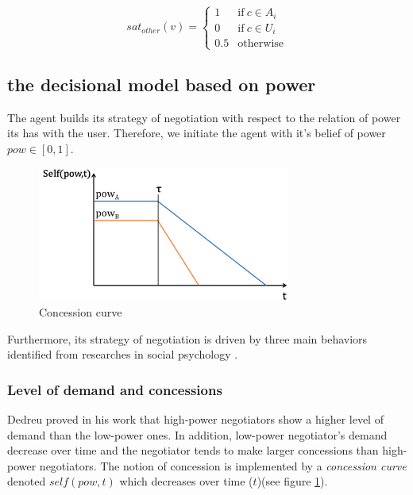 \documentclass[runningheads,a4paper]{llncs}
\begin{document}
		\begin{equation}
		sat_{other}(v)= \left\{\begin{array}{ll}
		1	 & \mathrm{if\ }  c \in A_i\\
		0    & \mathrm{if\ }c \in U_i\\
		0.5	 & \mathrm{otherwise}
		\end{array}\right.
		\end{equation}
	
	\subsection{the decisional model based on power}
		
	
	
	The agent builds its strategy of negotiation with respect to the relation of power its has with the user. Therefore, we initiate the agent with it's belief of power $pow \in [0,1]$. 
	
	\begin{figure}[t]
		
		\includegraphics[width=2.75 in, height = 1.75in]{graphs/sv3.png}
		\caption{\label{fig:conc} Concession curve}
	\end{figure} 

	Furthermore, its strategy of negotiation is driven by three main behaviors identified from researches in social psychology \cite{de1995impact,fiske1993controlling,magee2007power,de2004influence}. 

	\subsubsection{Level of demand and concessions}
	 
	Dedreu proved in his work \cite{de1995impact} that high-power negotiators show a higher level of demand than the low-power ones. In addition, low-power negotiator's demand decrease over time and the negotiator tends to make larger concessions than high-power negotiators. 
	The notion of concession is implemented by a \emph{concession curve} denoted  $self(pow, t)$ which decreases over time ($t$)(see figure \ref{fig:conc}). 
\end{document}

